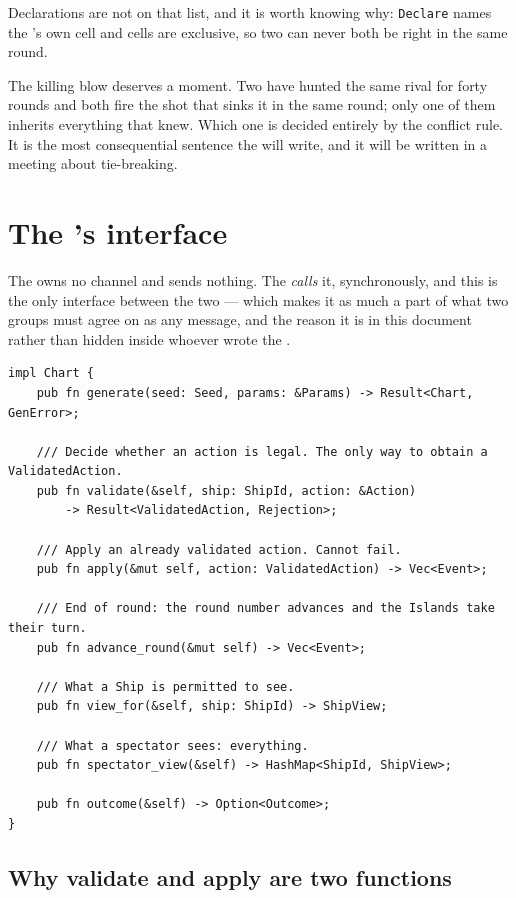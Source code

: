 \documentclass{article}
\begin{document}
Declarations are not on that list, and it is worth knowing why: \texttt{Declare} names the \ship's
own cell and cells are exclusive, so two \ships can never both be right in the same round.

The killing blow deserves a moment. Two \ships have hunted the same rival for forty rounds and both
fire the shot that sinks it in the same round; only one of them inherits everything that \ship{}
knew. Which one is decided entirely by the conflict rule. It is the most consequential sentence the
\WG{} will write, and it will be written in a meeting about tie-breaking.

\newpage
\section{The \chart's interface}
\label{proto:chartapi}

The \chart{} owns no channel and sends nothing. The \admiralty{} \emph{calls} it, synchronously,
and this is the only interface between the two --- which makes it as much a part of what two
groups must agree on as any message, and the reason it is in this document rather than hidden
inside whoever wrote the \chart.

\begin{lstlisting}
impl Chart {
    pub fn generate(seed: Seed, params: &Params) -> Result<Chart, GenError>;

    /// Decide whether an action is legal. The only way to obtain a ValidatedAction.
    pub fn validate(&self, ship: ShipId, action: &Action)
        -> Result<ValidatedAction, Rejection>;

    /// Apply an already validated action. Cannot fail.
    pub fn apply(&mut self, action: ValidatedAction) -> Vec<Event>;

    /// End of round: the round number advances and the Islands take their turn.
    pub fn advance_round(&mut self) -> Vec<Event>;

    /// What a Ship is permitted to see.
    pub fn view_for(&self, ship: ShipId) -> ShipView;

    /// What a spectator sees: everything.
    pub fn spectator_view(&self) -> HashMap<ShipId, ShipView>;

    pub fn outcome(&self) -> Option<Outcome>;
}
\end{lstlisting}

\subsection{Why validate and apply are two functions}
\end{document}
